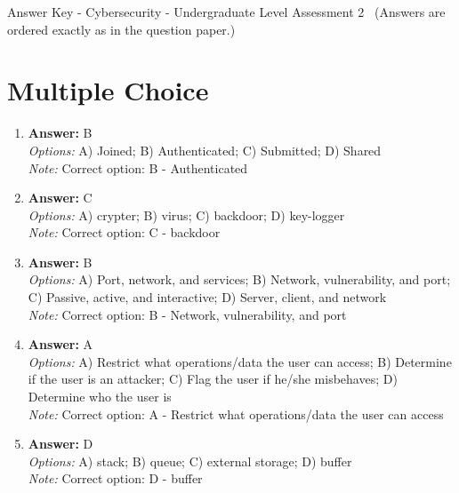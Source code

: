 \documentclass[12pt]{article}
\begin{document}
\begin{center}
Answer Key - Cybersecurity - Undergraduate Level Assessment 2 \
\small (Answers are ordered exactly as in the question paper.)
\end{center}

\section*{Multiple Choice}
\begin{enumerate}[label=\arabic*.]
\item \textbf{Answer:} B
\\ \textit{Options:} A) Joined; B) Authenticated; C) Submitted; D) Shared
\\ \textit{Note:} Correct option: B - Authenticated
\item \textbf{Answer:} C
\\ \textit{Options:} A) crypter; B) virus; C) backdoor; D) key-logger
\\ \textit{Note:} Correct option: C - backdoor
\item \textbf{Answer:} B
\\ \textit{Options:} A) Port, network, and services; B) Network, vulnerability, and port; C) Passive, active, and interactive; D) Server, client, and network
\\ \textit{Note:} Correct option: B - Network, vulnerability, and port
\item \textbf{Answer:} A
\\ \textit{Options:} A) Restrict what operations/data the user can access; B) Determine if the user is an attacker; C) Flag the user if he/she misbehaves; D) Determine who the user is
\\ \textit{Note:} Correct option: A - Restrict what operations/data the user can access
\item \textbf{Answer:} D
\\ \textit{Options:} A) stack; B) queue; C) external storage; D) buffer
\\ \textit{Note:} Correct option: D - buffer
\end{enumerate}
\end{document}
